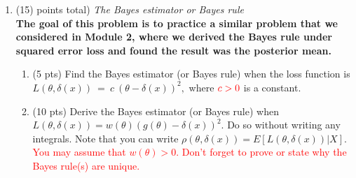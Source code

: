 \documentclass{article}
\begin{document}
\begin{enumerate}
  
  
\item (15)  points total) {\em The Bayes estimator or Bayes rule} \\
\textbf{The goal of this problem is to practice a similar problem that we considered in Module 2, where we derived the Bayes rule under squared error loss and found the result was the posterior mean.}\\
\begin{enumerate}
\item (5 pts) Find the Bayes estimator (or Bayes rule) when the loss function is  $L(\theta, \delta(x))~=~c~(\theta-\delta(x))^2,$ where $\textcolor{red}{c >0}$ is a constant. 
\item (10 pts) Derive the Bayes estimator (or Bayes rule) when $L(\theta, \delta(x)) = w(\theta) (g(\theta)-\delta(x))^2.$ Do so without writing any integrals. Note that you can write $\rho(\theta,\delta(x)) =  E[L(\theta,\delta(x))|X].$  \textcolor{red}{You may assume that $w(\theta) > 0.$} \textcolor{red}{Don't forget to prove or state why the Bayes rule(s) are unique.}
\end{enumerate}

%


\end{enumerate}
\end{document}
